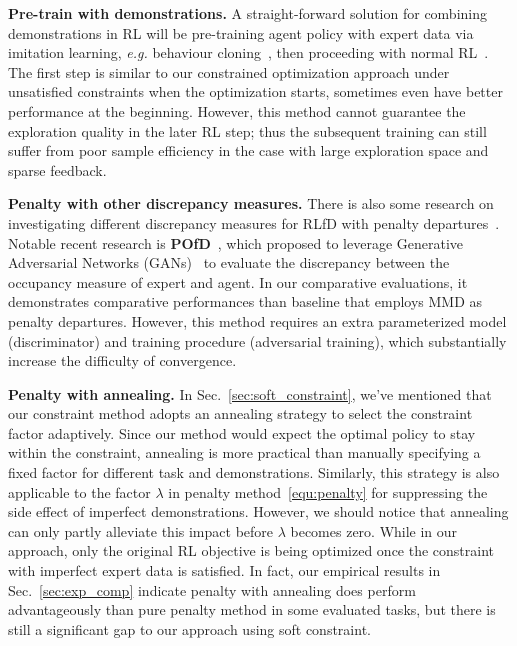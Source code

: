\documentclass[letterpaper]{article} %
\begin{document}
\noindent
\textbf{Pre-train with demonstrations.} A straight-forward solution for combining demonstrations in RL will be pre-training agent policy with expert data via imitation learning, \emph{e.g.} behaviour cloning~\cite{lfd1,lfd2}, then proceeding with normal RL~\cite{pretrain1,pretrain2}. The first step is similar to our constrained optimization approach under unsatisfied constraints when the optimization starts, sometimes even have better performance at the beginning. However, this method cannot guarantee the exploration quality in the later RL step; thus the subsequent training can still suffer from poor sample efficiency in the case with large exploration space and sparse feedback.

\noindent
\textbf{Penalty with other discrepancy measures.} There is also some research on investigating different discrepancy measures for RLfD with penalty departures~\cite{ijcaipofd1,pofd}. Notable recent research is \textbf{POfD}~\cite{pofd}, which proposed to leverage Generative Adversarial Networks (GANs)~\cite{GAN} to evaluate the discrepancy between the occupancy measure of expert and agent. In our comparative evaluations, it demonstrates comparative performances than baseline that employs MMD as penalty departures. However, this method requires an extra parameterized model (discriminator) and training procedure (adversarial training), which substantially increase the difficulty of convergence.

\noindent
\textbf{Penalty with annealing.} In Sec.~\ref{sec:soft_constraint}, we've mentioned that our constraint method adopts an annealing strategy to select the constraint factor adaptively. Since our method would expect the optimal policy to stay within the constraint, annealing is more practical than manually specifying a fixed factor for different task and demonstrations. Similarly, this strategy is also applicable to the factor $\lambda$ in penalty method~\eqref{equ:penalty} for suppressing the side effect of imperfect demonstrations. 
However, we should notice that annealing can only partly alleviate this impact before $\lambda$ becomes zero. While in our approach, only the original RL objective is being optimized once the constraint with imperfect expert data is satisfied. In fact, our empirical results in Sec.~\ref{sec:exp_comp} indicate penalty with annealing does perform advantageously than pure penalty method in some evaluated tasks, but there is still a significant gap to our approach using soft constraint. 
\end{document}
